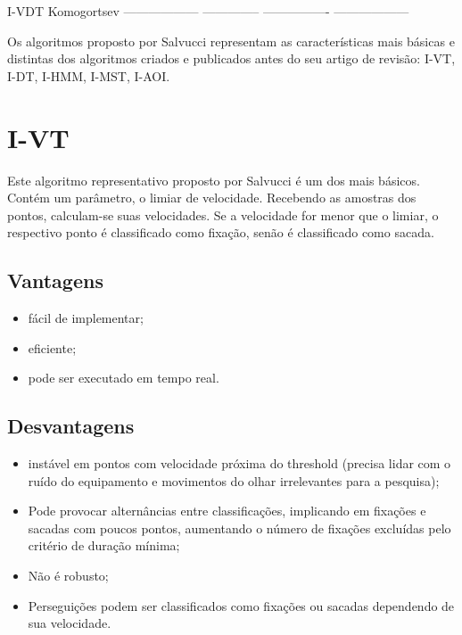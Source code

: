 \documentclass[brazil,]{report}
\begin{document}
I-VDT Komogortsev ------------------ -------------- ----------------
------------------

Os algoritmos proposto por Salvucci representam as características mais
básicas e distintas dos algoritmos criados e publicados antes do seu
artigo de revisão: I-VT, I-DT, I-HMM, I-MST, I-AOI.

\section{I-VT}\label{i-vt}

Este algoritmo representativo proposto por Salvucci é um dos mais
básicos. Contém um parâmetro, o limiar de velocidade. Recebendo as
amostras dos pontos, calculam-se suas velocidades. Se a velocidade for
menor que o limiar, o respectivo ponto é classificado como fixação,
senão é classificado como sacada.

\subsection{Vantagens}\label{vantagens}

\begin{itemize}
\itemsep1pt\parskip0pt
\item
  fácil de implementar;
\item
  eficiente;
\item
  pode ser executado em tempo real.
\end{itemize}

\subsection{Desvantagens}\label{desvantagens}

\begin{itemize}
\itemsep1pt\parskip0pt
\item
  instável em pontos com velocidade próxima do threshold (precisa lidar
  com o ruído do equipamento e movimentos do olhar irrelevantes para a
  pesquisa);
\item
  Pode provocar alternâncias entre classificações, implicando em
  fixações e sacadas com poucos pontos, aumentando o número de fixações
  excluídas pelo critério de duração mínima;
\item
  Não é robusto;
\item
  Perseguições podem ser classificados como fixações ou sacadas
  dependendo de sua velocidade.
\end{itemize}
\end{document}
